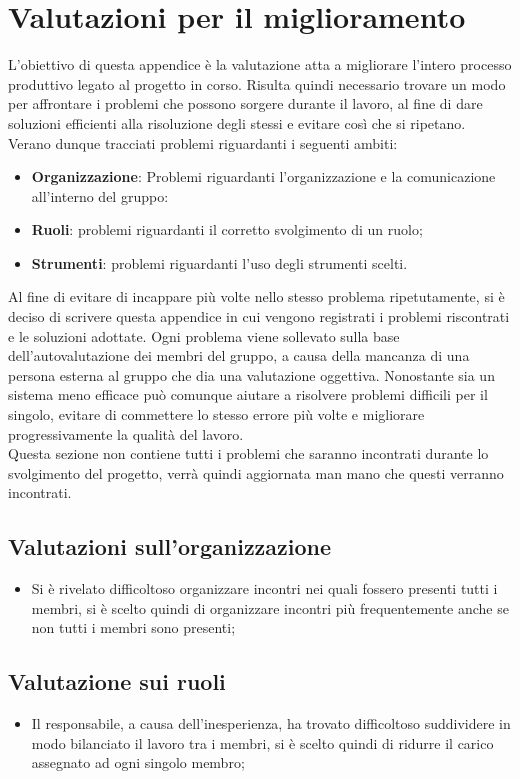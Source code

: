 \section{Valutazioni per il miglioramento}
	L'obiettivo di questa appendice è la valutazione atta a migliorare l'intero processo produttivo legato al progetto in corso. Risulta quindi necessario trovare un modo per affrontare i problemi che possono sorgere durante il lavoro, al fine di dare soluzioni efficienti alla risoluzione degli stessi e evitare così che si ripetano.\\
	Verano dunque tracciati problemi riguardanti i seguenti ambiti:
	\begin{itemize}
\item \textbf{Organizzazione}: Problemi riguardanti l'organizzazione e la comunicazione all'interno del gruppo:
\item \textbf{Ruoli}: problemi riguardanti il corretto svolgimento di un ruolo;
\item \textbf{Strumenti}: problemi riguardanti l'uso degli strumenti scelti.
\end{itemize}
Al fine di evitare di incappare più volte nello stesso problema ripetutamente, si è deciso di scrivere questa appendice in cui vengono registrati i problemi riscontrati e le soluzioni adottate. Ogni problema viene sollevato sulla base dell'autovalutazione dei membri del gruppo, a causa della mancanza di una persona esterna al gruppo che dia una valutazione oggettiva. Nonostante sia un sistema meno efficace può comunque aiutare a risolvere problemi difficili per il singolo, evitare di commettere lo stesso errore più volte e migliorare progressivamente la qualità del lavoro.\\
Questa sezione non contiene tutti i problemi che saranno incontrati durante lo svolgimento del progetto, verrà quindi aggiornata man mano che questi verranno incontrati.
\subsection{Valutazioni sull'organizzazione}
\begin{itemize}
\item Si è rivelato difficoltoso organizzare incontri nei quali fossero presenti tutti i membri, si è scelto quindi di organizzare incontri più frequentemente anche se non tutti i membri sono presenti;
\end{itemize}
\subsection{Valutazione sui ruoli}
\begin{itemize}
\item Il responsabile, a causa dell'inesperienza, ha trovato difficoltoso suddividere in modo bilanciato il lavoro tra i membri, si è scelto quindi di ridurre il carico assegnato ad ogni singolo membro;
\end{itemize}
